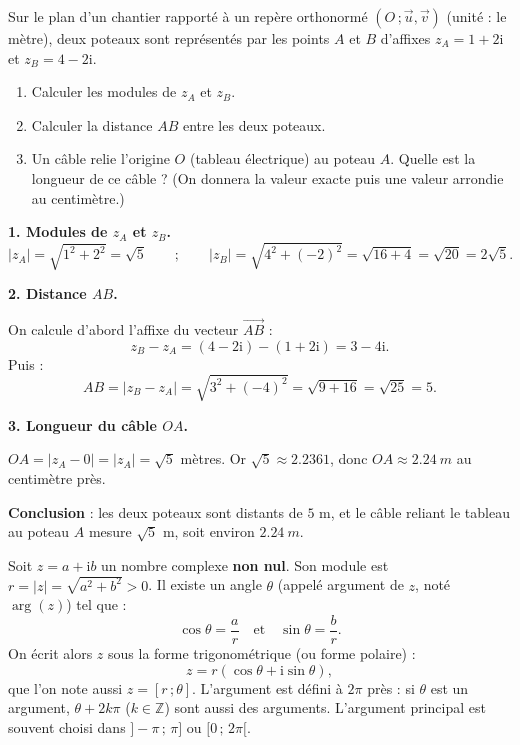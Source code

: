 \documentclass[11pt]{article}
\newcommand{\cle}[1]{{\popxbold\color{popdark}#1}}
\begin{document}
\begin{exoresolu}
Sur le plan d'un chantier rapporté à un repère orthonormé $(O\,;\vec{u},\vec{v})$ (unité : le mètre), deux poteaux sont représentés par les points $A$ et $B$ d'affixes $z_A = 1 + 2\mathrm{i}$ et $z_B = 4 - 2\mathrm{i}$.
\begin{enumerate}
\item Calculer les modules de $z_A$ et $z_B$.
\item Calculer la distance $AB$ entre les deux poteaux.
\item Un câble relie l'origine $O$ (tableau électrique) au poteau $A$. Quelle est la longueur de ce câble ? (On donnera la valeur exacte puis une valeur arrondie au centimètre.)
\end{enumerate}
\tcblower
\textbf{1. Modules de $z_A$ et $z_B$.}
\[|z_A| = \sqrt{1^2 + 2^2} = \sqrt{5} \qquad ; \qquad |z_B| = \sqrt{4^2 + (-2)^2} = \sqrt{16 + 4} = \sqrt{20} = 2\sqrt{5}.\]

\textbf{2. Distance $AB$.}

On calcule d'abord l'affixe du vecteur $\overrightarrow{AB}$ :
\[z_B - z_A = (4 - 2\mathrm{i}) - (1 + 2\mathrm{i}) = 3 - 4\mathrm{i}.\]
Puis :
\[AB = |z_B - z_A| = \sqrt{3^2 + (-4)^2} = \sqrt{9 + 16} = \sqrt{25} = 5.\]

\textbf{3. Longueur du câble $OA$.}

$OA = |z_A - 0| = |z_A| = \sqrt{5}$ mètres. Or $\sqrt{5} \approx \num{2,2361}$, donc $OA \approx \SI{2,24}{m}$ au centimètre près.

\textbf{Conclusion} : les deux poteaux sont distants de $5$ m, et le câble reliant le tableau au poteau $A$ mesure $\sqrt{5}$ m, soit environ $\SI{2,24}{m}$.
\end{exoresolu}

\begin{definition}
Soit $z = a + \mathrm{i}b$ un nombre complexe \textbf{non nul}. Son module est $r = |z| = \sqrt{a^2+b^2} > 0$.
Il existe un angle $\theta$ (appelé \cle{argument} de $z$, noté $\arg(z)$) tel que :
\[\cos\theta = \dfrac{a}{r} \quad \text{et} \quad \sin\theta = \dfrac{b}{r}.\]
On écrit alors $z$ sous la \cle{forme trigonométrique} (ou forme polaire) :
\[z = r(\cos\theta + \mathrm{i}\sin\theta),\]
que l'on note aussi $z = [r\,;\theta]$.
L'argument est défini à $2\pi$ près : si $\theta$ est un argument, $\theta + 2k\pi$ ($k \in \mathbb{Z}$) sont aussi des arguments. L'\cle{argument principal} est souvent choisi dans $]-\pi\,;\,\pi]$ ou $[0\,;\,2\pi[$.
\end{definition}
\end{document}
